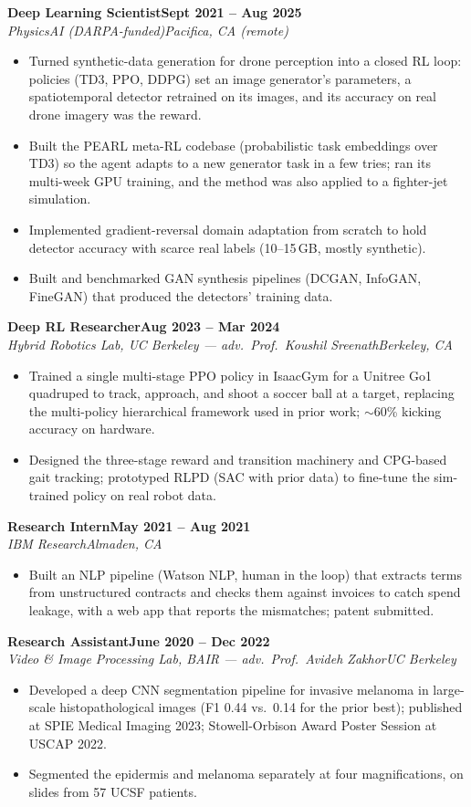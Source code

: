 \documentclass[10pt]{article}
\newcommand{\role}[4]{\textbf{#1}\hfill\textbf{#2}\\\textit{#3}\hfill\textit{#4}}
\begin{document}
\role{Deep Learning Scientist}{Sept 2021 -- Aug 2025}{PhysicsAI (DARPA-funded)}{Pacifica, CA (remote)}
\begin{itemize}
\item Turned synthetic-data generation for drone perception into a closed RL loop: policies (TD3, PPO, DDPG) set an image generator's parameters, a spatiotemporal detector retrained on its images, and its accuracy on real drone imagery was the reward.
\item Built the PEARL meta-RL codebase (probabilistic task embeddings over TD3) so the agent adapts to a new generator task in a few tries; ran its multi-week GPU training, and the method was also applied to a fighter-jet simulation.
\item Implemented gradient-reversal domain adaptation from scratch to hold detector accuracy with scarce real labels (10--15\,GB, mostly synthetic).
\item Built and benchmarked GAN synthesis pipelines (DCGAN, InfoGAN, FineGAN) that produced the detectors' training data.
\end{itemize}

\role{Deep RL Researcher}{Aug 2023 -- Mar 2024}{Hybrid Robotics Lab, UC Berkeley --- adv.\ Prof.\ Koushil Sreenath}{Berkeley, CA}
\begin{itemize}
\item Trained a single multi-stage PPO policy in IsaacGym for a Unitree Go1 quadruped to track, approach, and shoot a soccer ball at a target, replacing the multi-policy hierarchical framework used in prior work; $\sim$60\% kicking accuracy on hardware.
\item Designed the three-stage reward and transition machinery and CPG-based gait tracking; prototyped RLPD (SAC with prior data) to fine-tune the sim-trained policy on real robot data.
\end{itemize}

\role{Research Intern}{May 2021 -- Aug 2021}{IBM Research}{Almaden, CA}
\begin{itemize}
\item Built an NLP pipeline (Watson NLP, human in the loop) that extracts terms from unstructured contracts and checks them against invoices to catch spend leakage, with a web app that reports the mismatches; patent submitted.
\end{itemize}

\role{Research Assistant}{June 2020 -- Dec 2022}{Video \& Image Processing Lab, BAIR --- adv.\ Prof.\ Avideh Zakhor}{UC Berkeley}
\begin{itemize}
\item Developed a deep CNN segmentation pipeline for invasive melanoma in large-scale histopathological images (F1 0.44 vs.\ 0.14 for the prior best); published at SPIE Medical Imaging 2023; Stowell-Orbison Award Poster Session at USCAP 2022.
\item Segmented the epidermis and melanoma separately at four magnifications, on slides from 57 UCSF patients.
\end{itemize}
\end{document}
